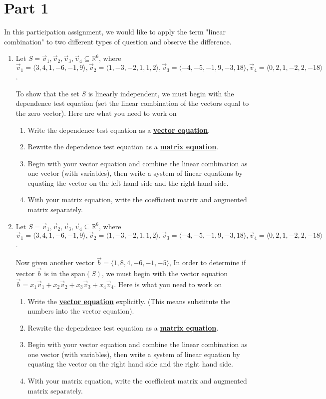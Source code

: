 \documentclass{article}
\begin{document}
\section{Part 1}
In this participation assignment, we would like to apply the term "linear combination" to two different types of question and observe the difference.
\begin{enumerate}[label = \textbf{\arabic*)}]
\item
	Let $ S = {\vec{v}_1, \vec{v}_2, \vec{v}_3, \vec{v}_4} \subseteq \mathbb{R}^6 $, where $ \vec{v}_1 = \langle 3, 4, 1, -6, -1, 9 \rangle, \vec{v}_2 = \langle 1, -3, -2, 1, 1, 2 \rangle, \vec{v}_3 = \langle -4, -5, -1, 9, -3, 18 \rangle, \vec{v}_4 = \langle 0, 2, 1, -2, 2, -18 \rangle $.

	To show that the set $ S $ is linearly independent, we must begin with the dependence test equation (set the linear combination of the vectors equal to the zero vector). Here are what you need to work on
	\begin{enumerate}[label = \alph*)]
		\item Write the dependence test equation as a \textbf{\underline{vector equation}}.
		\item Rewrite the dependence test equation as a \textbf{\underline{matrix equation}}.
		\item Begin with your vector equation and combine the linear combination as one vector (with variables), then write a system of linear equations by equating the vector on the left hand side and the right hand side.
		\item With your matrix equation, write the coefficient matrix and augmented matrix separately.
	\end{enumerate}
\item
	Let $ S = {\vec{v}_1, \vec{v}_2, \vec{v}_3, \vec{v}_4} \subseteq \mathbb{R}^6 $, where $ \vec{v}_1 = \langle 3, 4, 1, -6, -1, 9 \rangle, \vec{v}_2 = \langle 1, -3, -2, 1, 1, 2 \rangle, \vec{v}_3 = \langle -4, -5, -1, 9, -3, 18 \rangle, \vec{v}_4 = \langle 0, 2, 1, -2, 2, -18 \rangle $.

	Now given another vector $ \vec{b} = \langle 1, 8, 4, -6, -1, -5 \rangle $, In order to determine if vector $ \vec{b} $ is in the $ \text{span}(S) $, we must begin with the vector equation $ \vec{b} = x_1\vec{v}_1 + x_2\vec{v}_2 + x_3\vec{v}_3 + x_4\vec{v}_4 $. Here is what you need to work on
	\begin{enumerate}[label = \alph*)]
		\item Write the \textbf{\underline{vector equation}} explicitly. (This means substitute the numbers into the vector equation).
		\item Rewrite the dependence test equation as a \textbf{\underline{matrix equation}}.
		\item Begin with your vector equation and combine the linear combination as one vector (with variables), then write a system of linear equation by equating the vector on the right hand side and the right hand side.
		\item With your matrix equation, write the coefficient matrix and augmented matrix separately.
	\end{enumerate}
\end{enumerate}
\end{document}
